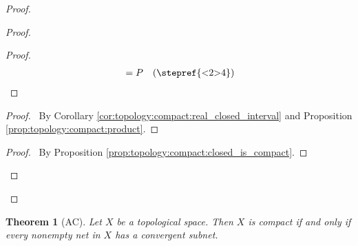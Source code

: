 \documentclass{report}
\let\qed\relax
\newtheorem{thm}[lm]{Theorem}
\theoremstyle{definition}
\begin{document}
\begin{proof}
\begin{proof}
\begin{proof}
\begin{align*}
          & = P & (\text{\stepref{<2>4}})
        \end{align*}
      \end{proof}
      \begin{proof}
        \pf\ By Corollary \ref{cor:topology:compact:real_closed_interval} and
        Proposition \ref{prop:topology:compact:product}.
      \end{proof}
      \qedstep
      \begin{proof}
        \pf\ By Proposition \ref{prop:topology:compact:closed_is_compact}.
      \end{proof}
    \end{proof}
    \qed
  \end{proof}

  \begin{thm}[AC]
    \label{thm:topology:convergence:compact}
   Let $X$ be a topological space. Then $X$ is compact if and only if every
   nonempty net in $X$ has a convergent subnet.
  \end{thm}
\end{document}
